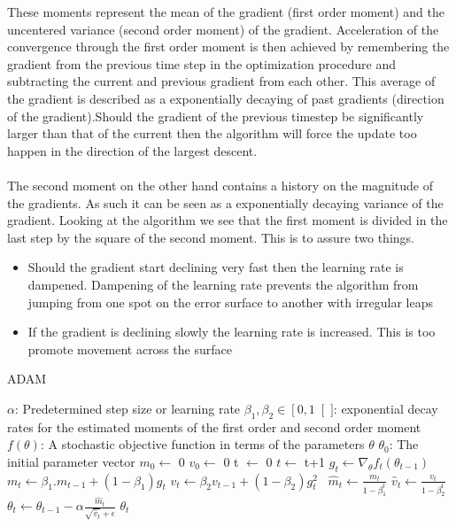 \documentclass[12pt]{article}
\begin{document}
These moments represent the mean of the gradient (first order moment) and the uncentered variance (second order moment) of the gradient\cite{Kingma2014}. Acceleration of the convergence through the first order moment is then achieved by remembering the gradient from the previous time step in the optimization procedure and subtracting the current and previous gradient from each other. This average of the gradient is described as a exponentially decaying of past gradients (direction of the gradient).Should the gradient of the previous timestep be significantly larger than that of the current then the algorithm will force the update too happen in the direction of the largest descent. \cite{Budumu}
\\
\\
The second moment on the other hand contains a history on the magnitude of the gradients. As such it can be seen as a exponentially decaying variance of the gradient. Looking at the algorithm we see that the first moment is divided in the last step by the square of the second moment. This is to assure two things.
\begin{itemize}
	\item Should the gradient start declining very fast then the learning rate is dampened. Dampening of the learning rate prevents the algorithm from jumping from one spot on the error surface to another with irregular leaps
	\item If the gradient is declining slowly the learning rate is increased. This is too promote movement across the surface
\end{itemize}
\begin{algorithm}[H]
	\caption{ADAM}
	\begin{algorithmic}[1]
		\Require $\alpha$: Predetermined step size or learning rate
		\Require $\beta_1, \beta_2 \in \left[0,1\right[]$: exponential decay rates for the estimated moments of the first order and second order moment
		\Require $f(\theta)$: A stochastic objective function in terms of the parameters $\theta$ 
		\Require $\theta_0$: The initial parameter vector
		\State $m_0 \leftarrow$ 0  
		\State $v_0 \leftarrow$ 0 
		\State t $\leftarrow$ 0 
		\State $t \leftarrow$ t+1
		\State $g_t \leftarrow \nabla_{\theta}f_t(\theta_{t-1})$ 
		\State $m_t \leftarrow \beta_1.m_{t-1}+(1-\beta_1)g_t$ 
		\State $v_t \leftarrow \beta_2 v_{t-1}+ (1-\beta_2)g_t^2$ \
		\State $\hat{m}_t \leftarrow \frac{m_t}{1-\beta_1^t}$ 
		\State $\hat{v}_t \leftarrow \frac{v_t}{1-\beta_2^t}$ 
		\State $\theta_t \leftarrow \theta_{t-1}-\alpha \frac{\hat{m}_t}{\sqrt{\hat{v}_t}+\epsilon} $ 
		\EndWhile
		\State \Return $\theta_t$
	\end{algorithmic}
\end{algorithm}
\cite{Kingma2014}  
\newpage
\cleardoublepage
\end{document}
